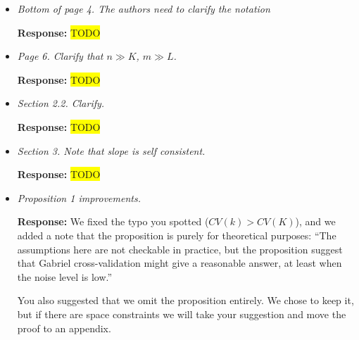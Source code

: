 \documentclass[11pt]{article}
\newcommand{\hilight}[1]{\colorbox{yellow}{#1}}
\newcommand{\todo}{\hilight{TODO}}
\begin{document}
\begin{itemize}

\item \textit{Bottom of page 4. The authors need to clarify the notation}

\textbf{Response:} \todo



\item \textit{Page 6. Clarify that $n \gg K$, $m \gg L$.}

\textbf{Response:} \todo

%
%


\item \textit{Section 2.2. Clarify.}

\textbf{Response:} \todo




\item \textit{Section 3. Note that slope is self consistent.}

\textbf{Response:} \todo



\item \textit{Proposition 1 improvements.}

\textbf{Response:} We fixed the typo you spotted ($CV(k) > CV(K)$), and we
added a note that the proposition is purely for theoretical purposes:
``The assumptions here are not checkable in practice, but the proposition
suggest that Gabriel cross-validation might give a reasonable answer, at least
when the noise level is low.''

You also suggested that we omit the proposition entirely. We chose to keep it,
but if there are space constraints we will take your suggestion and move the
proof to an appendix.


\end{itemize}
\end{document}
